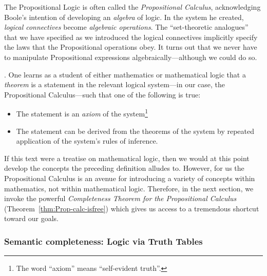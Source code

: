 
\medskip

The Propositional Logic is often called the {\it Propositional
  Calculus},  acknowledging Boole's
intention of developing an {\em algebra} of logic.  In the system he
created, {\em logical connectives} become {\em algebraic operations}.
The ``set-theoretic analogues'' that we have specified as we
introduced the logical connectives implicitly specify the laws that
the Propositional operations obey.  It turns out that we never have to
manipulate Propositional expressions algebraically---although we could
do so.

\bigskip

.
One learns as a student of either mathematics or mathematical logic
that a {\it theorem} is a statement in the relevant logical
system---in our case, the Propositional Calculus---such that one of
the following is true:

\begin{itemize}
\item
The statement is an {\it axiom} of the system\footnote{The word ``axiom'' means ``self-evident truth''.}
\item
The statement can be derived from the theorems of the system by repeated
  application of the system's rules of inference.
\end{itemize}
If this text were a treatise on mathematical logic, then we would at
this point develop the concepts the preceding definition alludes to.
However, for us the Propositional Calculus is an avenue for
introducing a variety of concepts within mathematics, not within
mathematical logic.  Therefore, in the next section, we invoke the
powerful {\it Completeness Theorem for the Propositional Calculus}
(Theorem~\ref{thm:Prop-calc-isfree}) which gives us access to a
tremendous shortcut toward our goals.


\subsubsection{Semantic completeness: Logic via Truth Tables}
\label{sec:truth-tables}

